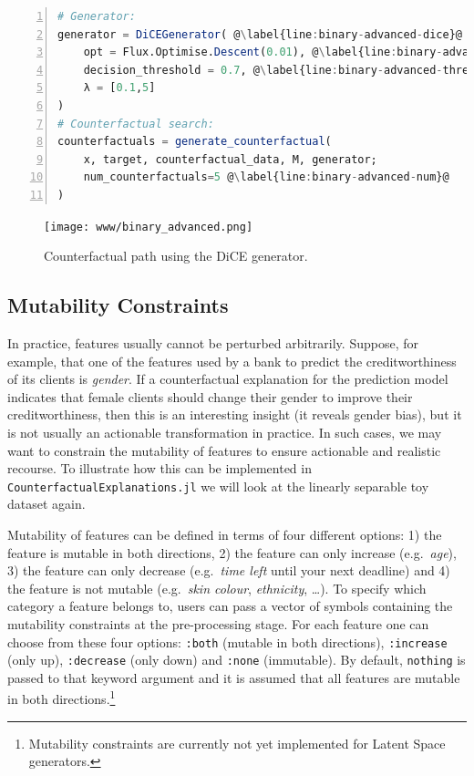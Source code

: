 \documentclass{juliacon}
\begin{document}
\begin{lstlisting}[language=Julia, escapechar=@, numbers=left, label={lst:binary-advanced}, caption={}]
# Generator:
generator = DiCEGenerator( @\label{line:binary-advanced-dice}@
    opt = Flux.Optimise.Descent(0.01), @\label{line:binary-advanced-opt}@
    decision_threshold = 0.7, @\label{line:binary-advanced-thresh}@
    λ = [0.1,5]
)
# Counterfactual search:
counterfactuals = generate_counterfactual(
    x, target, counterfactual_data, M, generator;
    num_counterfactuals=5 @\label{line:binary-advanced-num}@
)
\end{lstlisting}

\begin{figure}

{\centering \texttt{[image: www/binary\_advanced.png]}

}

\caption{\label{fig-binary-advanced}Counterfactual path using the DiCE
generator.}

\end{figure}

\hypertarget{mutability-constraints}{%
\subsection{Mutability Constraints}\label{mutability-constraints}}

In practice, features usually cannot be perturbed arbitrarily. Suppose,
for example, that one of the features used by a bank to predict the
creditworthiness of its clients is \emph{gender}. If a counterfactual
explanation for the prediction model indicates that female clients
should change their gender to improve their creditworthiness, then this
is an interesting insight (it reveals gender bias), but it is not
usually an actionable transformation in practice. In such cases, we may
want to constrain the mutability of features to ensure actionable and
realistic recourse. To illustrate how this can be implemented in
\texttt{CounterfactualExplanations.jl} we will look at the linearly
separable toy dataset again.

Mutability of features can be defined in terms of four different
options: 1) the feature is mutable in both directions, 2) the feature
can only increase (e.g.~\emph{age}), 3) the feature can only decrease
(e.g.~\emph{time left} until your next deadline) and 4) the feature is
not mutable (e.g.~\emph{skin colour}, \emph{ethnicity}, \ldots). To
specify which category a feature belongs to, users can pass a vector of
symbols containing the mutability constraints at the pre-processing
stage. For each feature one can choose from these four options:
\texttt{:both} (mutable in both directions), \texttt{:increase} (only
up), \texttt{:decrease} (only down) and \texttt{:none} (immutable). By
default, \texttt{nothing} is passed to that keyword argument and it is
assumed that all features are mutable in both directions.\footnote{Mutability
  constraints are currently not yet implemented for Latent Space
  generators.}
\end{document}
